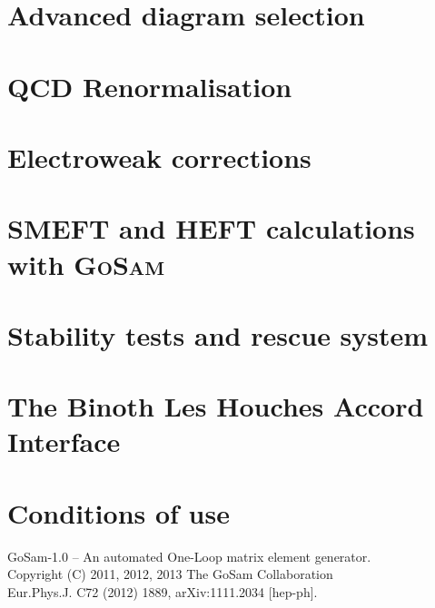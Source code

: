 \documentclass[11pt,a4paper, oneside]{scrbook}
\newcommand{\gosam}{\textsc{GoSam}\xspace}
\begin{document}
\chapter{Advanced diagram selection}


\chapter{QCD Renormalisation}
\label{chp:renormalisation}


\chapter{Electroweak corrections}


\chapter{SMEFT and HEFT calculations with \gosam}
\label{sec:EFT}


\chapter{Stability tests and rescue system}
\label{sec:rescue}


\chapter{The Binoth Les Houches Accord Interface}
\label{sec:blha}


\appendix



\chapter*{Conditions of use}
    GoSam-1.0 -- An automated One-Loop matrix element generator.\\
    Copyright (C) 2011, 2012, 2013  The GoSam Collaboration\\
    Eur.Phys.J. C72 (2012) 1889, arXiv:1111.2034 [hep-ph].\\
    
\end{document}
